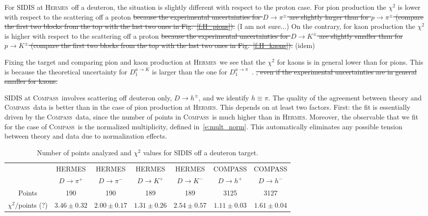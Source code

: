 \documentclass[aps,preprintnumbers,showpacs,nofootinbib,superscriptaddress,floatfix]{revtex4}
\newcommand{\AS}[1]{{\textcolor[rgb]{1,0,1}{#1}}}
\newcommand{\hermes}{\textsc{Hermes}}
\newcommand{\compass}{\textsc{Compass}}
\begin{document}
For SIDIS at \hermes\ off a deuteron, the situation is slightly different with respect to the proton case.
For pion production the $\chi^2$ is lower with respect to the scattering off a proton \AS{\sout{because the experimental uncertainties for $D \to \pi^\pm$ are slightly larger than for $p \to \pi^\pm$ (compare the first two blocks from the top with the last two ones in Fig.~\ref{f:H_pions}).} (I am not sure...)}
On the contrary, for kaon production the $\chi^2$ is higher with respect to the scattering off a proton \AS{\sout{because the experimental uncertainties for $D \to K^\pm$ are slightly smaller than for $p \to K^\pm$ (compare the first two blocks from the top with the last two ones in Fig.~\ref{f:H_kaons}).} (idem)}

Fixing the target and comparing pion and kaon production at \hermes\, we see that the $\chi^2$ for kaons is in general lower than for pions. This is because the theoretical uncertainty for $D_1^{a \to K}$ is larger than the one for $D_1^{a \to \pi}$~\cite{Epele:2012vg,Signori:2013mda}. \AS{\sout{, even if the experimental uncertainties are in general smaller for kaons.}}

SIDIS at \compass\ involves scattering off deuteron only, $D \to h^\pm$, and we identify $h \equiv \pi$. 
The quality of the agreement between theory and \compass\ data is better than in the case of pion production at \hermes. This depends on at least two factors. First: the fit is essentially driven by the \compass\ data, since the number of points in \compass\ is much higher than in \hermes. Moreover, the observable that we fit for the case of \compass\ is the normalized multiplicity, defined in~\eqref{e:mult_norm}. This automatically eliminates any possible tension between theory and data due to normalization effects.
\begin{table}[h!]
\begin{center}
\begin{tabular}{|c|c|c|c|c|c|c|}
 \hline
\hline
  & HERMES & HERMES & HERMES & HERMES & COMPASS & COMPASS\\
 ~          &  $D \to \pi^+$    &   $D \to \pi^-$    &  $D \to K^+$    &   $D \to K^-$      &  $D \to h^+$    &   $D \to h^-$            \\
\hline
 Points         &  190 & 190 & 189 & 189   & 3125 & 3127   \\
 \hline
$\chi^2 /$\AS{points (?)} & $3.46\pm 0.32$ & $2.00\pm 0.17$ & $1.31\pm 0.26$ & $2.54\pm 0.57$  & $1.11\pm 0.03$ & $1.61\pm 0.04$ \\            
 \hline
 \hline
\end{tabular}
\caption{Number of points analyzed and $\chi^2$ values for SIDIS off a deuteron target.} 
\label{t:fl_ind_chi2_eD}
\end{center}
\end{table}
\end{document}
